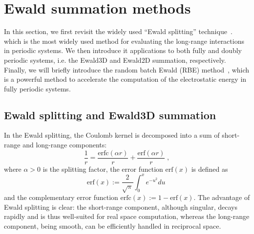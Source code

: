 \section{Ewald summation methods}

In this section, we first revisit the widely used ``Ewald splitting'' technique~\cite{Ewald1921AnnPhys}. which is the most widely used method for evaluating the long-range interactions in periodic systems.
We then introduce it applications to both fully and doubly periodic systems, i.e. the Ewald3D and Ewald2D summation, respectively.
Finally, we will briefly introduce the random batch Ewald (RBE) method~\cite{jin2021random}, which is a powerful method to accelerate the computation of the electrostatic energy in fully periodic systems.

\subsection{Ewald splitting and Ewald3D summation} \label{sec::ewald_splitting}

In the Ewald splitting, the Coulomb kernel is decomposed into a sum of short-range and long-range components:
\begin{equation}\label{eq:ewald_decomposition}
\frac{1}{r}=\frac{\mathrm{erfc}(\alpha r)}{r}+\frac{\mathrm{erf}(\alpha r)}{r} \;,
\end{equation}
where $\alpha>0$ is the splitting factor, the error function $\mathrm{erf}(x)$ is  defined as
\begin{equation}\label{eq:erf}
    \mathrm{erf}(x):=\frac{2}{\sqrt{\pi}}\int_0^x e^{-u^2}du\;
\end{equation}
and the complementary error function $\mathrm{erfc}(x):=1-\mathrm{erf}(x)$. 
The advantage of Ewald splitting is clear:
the short-range component, although singular, decays rapidly and is thus well-suited for real space computation, whereas the long-range component, being smooth, can be efficiently handled in reciprocal space.

